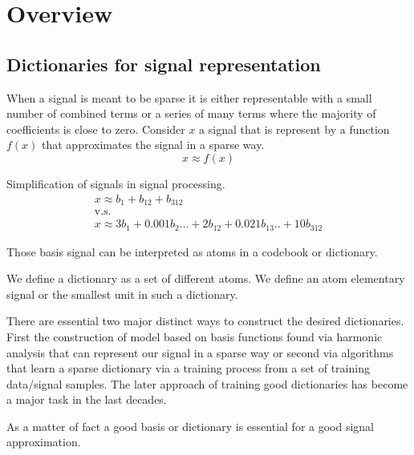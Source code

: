 \chapter{Overview}

\section{Dictionaries for signal representation}

When a signal is meant to be sparse it is either representable with a small
number of combined terms or a series of many terms where the majority of
coefficients is close to zero. Consider $x$ a signal that is represent by a
function $f(x)$ that approximates the signal in a sparse way.
\begin{equation*}
x \approx f\left(x\right)
\end{equation*}

Simplification of signals in signal processing.
\begin{gather*}
x \approx b_{1} + b_{12} + b_{312}\\
 \text{v.s.}\\ x \approx 3b_{1} + 0.001b_{2} ... + 2b_{12} + 0.021b_{13} .. + 10b_{312}
\end{gather*}



Those basis signal can be interpreted as atoms in a codebook or dictionary.

We define a dictionary as a set of different atoms. We define an atom
elementary signal or the smallest unit in such a dictionary.

There are essential two major distinct ways to construct the 
desired dictionaries. First the construction of model based on basis functions
found via harmonic analysis that can represent our signal in a sparse way or
second via algorithms that learn a sparse dictionary via a training process from
a set of training data/signal samples. The later approach of training good
dictionaries has become a major task in the last decades\cite{Mairal2010}.

As a matter of fact a good basis or dictionary is essential for a good
signal approximation\cite{}.



